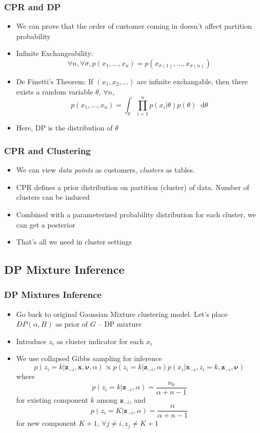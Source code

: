 \documentclass{beamer}
\newcommand*\diff{\mathop{}\!\mathrm{d}}
\begin{document}
\begin{frame}
	\frametitle{CPR and DP}
	\begin{itemize}
		\item We can prove that the order of customer coming in doesn't affect partition probability
		\item Infinite Exchangeability:
			\[
			\forall n, \forall \sigma, p(x_1, \ldots, x_n)=p(x_{\sigma(1)},\ldots, x_{\sigma(n)})
			\]
		\item De Finetti’s Theorem: If $(x_1, x_2, \ldots)$ are infinite exchangable, then there exists a random variable $\theta$, $\forall n$, 
			\[
			 p(x_1, \ldots, x_n) = \int_{\theta} \prod_{i=1}^n p(x_i|\theta)p(\theta) \diff \theta
			\]		
		\item Here, DP is the distribution of $\theta$	
	\end{itemize}
\end{frame}

\begin{frame}
	\frametitle{CPR and Clustering}
	\begin{itemize}
		\item We can view {\em data points} as customers, {\em clusters} as tables.
		\item CPR defines a prior distribution on partition (cluster) of data. Number of clusters can be induced
		\item Combined with a parameterized probability distribution for each cluster, we can get a posterior
		\item That's all we need in cluster settings
	\end{itemize}
\end{frame}

\subsection{DP Mixture Inference}

\begin{frame}
	\frametitle{DP Mixtures Inference}
	\begin{itemize}
		\item Go back to original Gaussian Mixture clustering model. Let's place $DP(\alpha,H)$ as prior of $G$ -- DP mixture
		\item Introduce $z_i$ as cluster indicator for each $x_i$
		\item We use collapsed Gibbs sampling for inference
		\[
			p(z_i=k|\bm{z}_{-i},\bm{x},\bm{\nu},\alpha) \propto p(z_i=k|\bm{z}_{-i}, \alpha)p(x_i|\bm{x}_{-i}, z_i=k, \bm{z}_{-i}, \bm{\nu})
		\]
		where \[
			p(z_i=k|\bm{z}_{-i}, \alpha) = \frac{n_k}{\alpha+n-1}
		\] for existing component $k$ among $\bm{z}_{-i}$, and 
		\[
			p(z_i=K|\bm{z}_{-i}, \alpha) = \frac{\alpha}{\alpha+n-1}
		\] for new component $K+1$, $\forall j \neq i, z_j \neq K+1$
	\end{itemize}
\end{frame}
\end{document}

